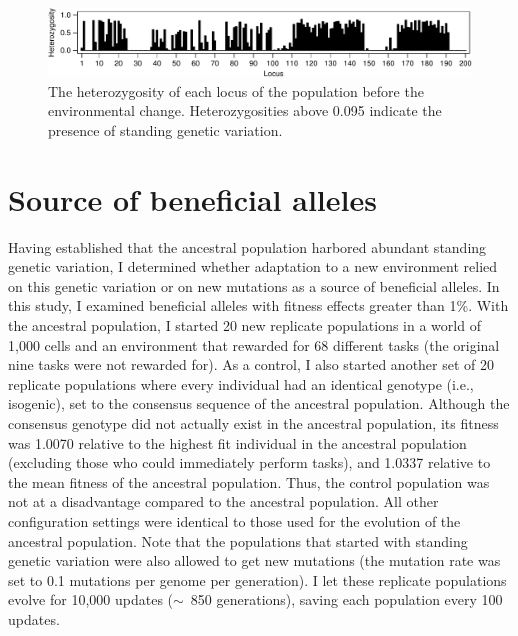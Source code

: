 \begin{doublespace}
\begin{figure}[b!]
\begin{center}
\includegraphics[width=\linewidth]{heterozygosity-plot.pdf}
\caption{The heterozygosity of each locus
  of the population before the environmental change.
  Heterozygosities above 0.095 indicate
  the presence of standing genetic variation.}
\label{heterozygosity-plot}
\end{center}
\end{figure}



\section{Source of beneficial alleles}



Having established that the ancestral population
harbored abundant standing genetic variation,
I determined whether adaptation to a new environment
relied on this genetic variation or on new mutations
as a source of beneficial alleles.
%
In this study, I examined beneficial alleles
with fitness effects greater than 1\%.
%
With the ancestral population,
I started 20 new replicate populations
in a world of 1,000 cells and an environment
that rewarded for 68 different tasks
(the original nine tasks were not rewarded for).
%
As a control,
I also started another set of 20 replicate populations
where every individual had an identical genotype (i.e., isogenic),
set to the consensus sequence of the ancestral population.
%
Although the consensus genotype did not actually exist
in the ancestral population,
its fitness was 1.0070 relative to the highest fit individual
in the ancestral population
(excluding those who could immediately perform tasks),
and 1.0337 relative to the mean fitness of the ancestral population.
%
Thus, the control population was not at a disadvantage
compared to the ancestral population.
%
All other configuration settings were identical
to those used for the evolution of the ancestral population.
%
Note that the populations that started with standing genetic variation
were also allowed to get new mutations
(the mutation rate was set to 0.1 mutations per genome per generation).
%
I let these replicate populations
evolve for 10,000 updates ($\sim$~850 generations),
saving each population every 100 updates.






\end{doublespace}

